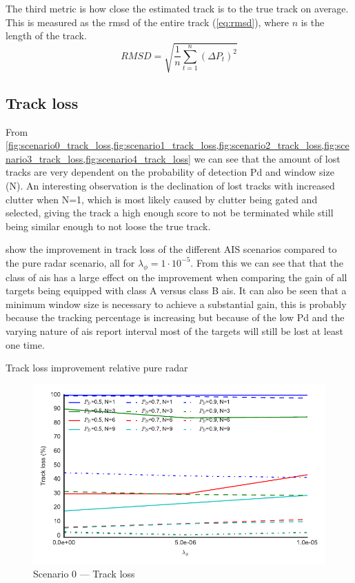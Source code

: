 The third metric is how close the estimated track is to the true track on average. This is measured as the \gls{rmsd} of the entire track (\ref{eq:rmsd}), where \(n\) is the length of the track.
\begin{equation}\label{eq:rmsd}
RMSD = \sqrt{\frac{1}{n}\sum_{t=1}^{n}{(\Delta P_t)}^2}
\end{equation}



\subsection{Track loss}
From \cref{fig:scenario0_track_loss,fig:scenario1_track_loss,fig:scenario2_track_loss,fig:scenario3_track_loss,fig:scenario4_track_loss} we can see that the amount of lost tracks are very dependent on the probability of detection \gls{Pd} and window size (N). An interesting observation is the declination of lost tracks with increased clutter when N=1, which is most likely caused by clutter being gated and selected, giving the track a high enough score to not be terminated while still being similar enough to not loose the true track.

 show the improvement in track loss of the different AIS scenarios compared to the pure radar scenario, all for \(\lambda_\phi = 1\cdot 10^{-5}\). From this we can see that that the class of \gls{ais} has a large effect on the improvement when comparing the gain of all targets being equipped with class A versus class B \gls{ais}. It can also be seen that a minimum window size is necessary to achieve a substantial gain, this is probably because the tracking percentage is increasing but because of the low \gls{Pd} and the varying nature of \gls{ais} report interval most of the targets will still be lost at least one time.

\begin{table}[H]
\centering
{}
\caption{Track loss improvement relative pure radar}\label{tab:track_loss_improvement}
\end{table}

\begin{figure}
\centering
\includegraphics{Figures/plots/Scenario0_Tracking-TrackLoss.pdf}
\caption{Scenario 0 --- Track loss}\label{fig:scenario0_track_loss}
\end{figure}

